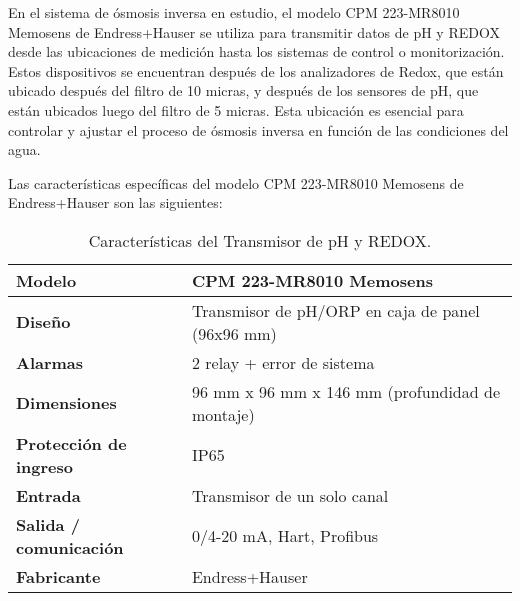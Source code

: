 En el sistema de ósmosis inversa en estudio, el modelo CPM 223-MR8010 Memosens de Endress+Hauser se utiliza para transmitir datos de pH y REDOX
desde las ubicaciones de medición hasta los sistemas de control o monitorización. Estos dispositivos se encuentran después de los analizadores de Redox,
que están ubicado después del filtro de 10 micras, y después de los sensores de pH, que están ubicados luego del filtro de 5 micras. Esta ubicación
es esencial para controlar y ajustar el proceso de ósmosis inversa en función de las condiciones del agua.

Las características específicas del modelo CPM 223-MR8010 Memosens de Endress+Hauser son las siguientes:\\



\begin{table}[H]
    \centering
    \caption{Características del Transmisor de pH y REDOX.}
    \label{table:transmisor_pH}
    \begin{tabular}{| L{5cm} | L{5cm} |}

        \hline
        \textbf{Modelo}                & CPM 223-MR8010 Memosens                          \\
        \hline

        \textbf{Diseño}                & Transmisor de pH/ORP en caja de panel (96x96 mm) \\
        \hline
        \textbf{Alarmas}               & 2 relay + error de sistema                       \\
        \hline
        \textbf{Dimensiones}           & 96 mm x 96 mm x 146 mm (profundidad de montaje)  \\
        \hline
        \textbf{Protección de ingreso} & IP65                                             \\
        \hline
        \textbf{Entrada}               & Transmisor de un solo canal                      \\
        \hline
        \textbf{Salida / comunicación} & 0/4-20 mA, Hart, Profibus                        \\
        \hline

        \textbf{Fabricante}            & Endress+Hauser                                   \\
        \hline
    \end{tabular}
\end{table}



